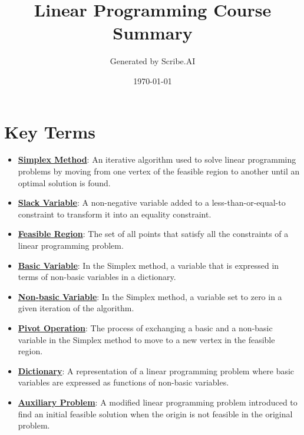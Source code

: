 \documentclass{article}%
\title{Linear Programming Course Summary}%
\author{Generated by Scribe.AI}%
\date{\today}%
\begin{document}
%
\normalsize%
\maketitle%
\section{Key Terms}%
\label{sec:KeyTerms}%
\begin{itemize}[leftmargin=*]%
\item \href{https://www.math.purdue.edu/~yipn/421/2024-08-27-ExSimplex.pdf#page=1}{\textbf{Simplex Method}}: An iterative algorithm used to solve linear programming problems by moving from one vertex of the feasible region to another until an optimal solution is found.%
\item \href{https://www.math.purdue.edu/~yipn/421/2024-08-27-ExSimplex.pdf#page=1}{\textbf{Slack Variable}}: A non-negative variable added to a less-than-or-equal-to constraint to transform it into an equality constraint.%
\item \href{https://www.math.purdue.edu/~yipn/421/2024-08-27-ExSimplex.pdf#page=2}{\textbf{Feasible Region}}: The set of all points that satisfy all the constraints of a linear programming problem.%
\item \href{https://www.math.purdue.edu/~yipn/421/2024-08-27-ExSimplex.pdf#page=9}{\textbf{Basic Variable}}: In the Simplex method, a variable that is expressed in terms of non-basic variables in a dictionary.%
\item \href{https://www.math.purdue.edu/~yipn/421/2024-08-27-ExSimplex.pdf#page=6}{\textbf{Non{-}basic Variable}}: In the Simplex method, a variable set to zero in a given iteration of the algorithm.%
\item \href{https://www.math.purdue.edu/~yipn/421/2024-08-27-ExSimplex.pdf#page=9}{\textbf{Pivot Operation}}: The process of exchanging a basic and a non-basic variable in the Simplex method to move to a new vertex in the feasible region.%
\item \href{https://www.math.purdue.edu/~yipn/421/2024-08-27-ExSimplex.pdf#page=26}{\textbf{Dictionary}}: A representation of a linear programming problem where basic variables are expressed as functions of non-basic variables.%
\item \href{https://www.math.purdue.edu/~yipn/421/2024-08-27-ExSimplex.pdf#page=32}{\textbf{Auxiliary Problem}}: A modified linear programming problem introduced to find an initial feasible solution when the origin is not feasible in the original problem.%

\end{itemize}
\end{document}
